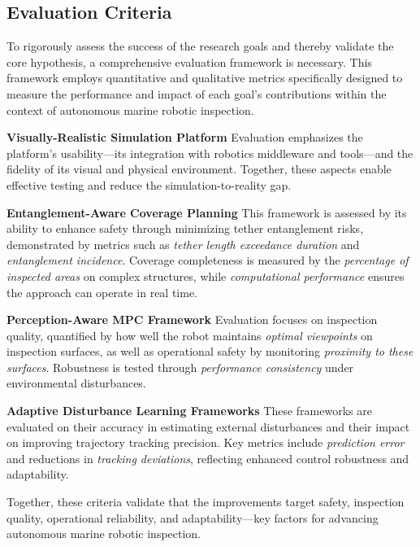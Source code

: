 \subsection{Evaluation Criteria}

To rigorously assess the success of the research goals and thereby validate the core hypothesis, a comprehensive evaluation framework is necessary. This framework employs quantitative and qualitative metrics specifically designed to measure the performance and impact of each goal’s contributions within the context of autonomous marine robotic inspection.

\noindent\textbf{Visually-Realistic Simulation Platform}  
Evaluation emphasizes the platform's usability—its integration with robotics middleware and tools—and the fidelity of its visual and physical environment. Together, these aspects enable effective testing and reduce the simulation-to-reality gap.

\noindent\textbf{Entanglement-Aware Coverage Planning}  
This framework is assessed by its ability to enhance safety through minimizing tether entanglement risks, demonstrated by metrics such as \textit{tether length exceedance duration} and \textit{entanglement incidence}. Coverage completeness is measured by the \textit{percentage of inspected areas} on complex structures, while \textit{computational performance} ensures the approach can operate in real time.

\noindent\textbf{Perception-Aware MPC Framework}  Evaluation focuses on inspection quality, quantified by how well the robot maintains \textit{optimal viewpoints} on inspection surfaces, as well as operational safety by monitoring \textit{proximity to these surfaces}. Robustness is tested through \textit{performance consistency} under environmental disturbances.

\noindent \textbf{Adaptive Disturbance Learning Frameworks}  
These frameworks are evaluated on their accuracy in estimating external disturbances and their impact on improving trajectory tracking precision. Key metrics include \textit{prediction error} and reductions in \textit{tracking deviations}, reflecting enhanced control robustness and adaptability.

Together, these criteria validate that the improvements target safety, inspection quality, operational reliability, and adaptability—key factors for advancing autonomous marine robotic inspection.
